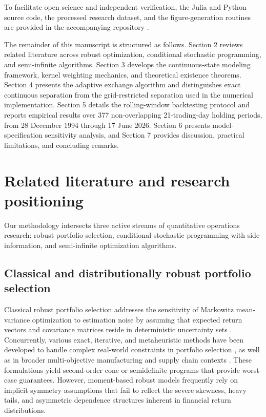\documentclass[smallextended]{svjour3}
\begin{document}
To facilitate open science and independent verification, the Julia and
Python source code, the processed research dataset, and the figure-generation
routines are provided in the accompanying repository
\citep{bezoui2026robust}.

The remainder of this manuscript is structured as follows. Section 2 reviews related literature across robust optimization, conditional stochastic programming, and semi-infinite algorithms. Section 3 develops the continuous-state modeling framework, kernel weighting mechanics, and theoretical existence theorems. Section 4 presents the adaptive exchange algorithm and distinguishes exact continuous separation from the grid-restricted separation used in the numerical implementation. Section 5 details the rolling-window backtesting protocol and reports
empirical results over 377 non-overlapping 21-trading-day holding periods,
from 28 December 1994 through 17 June 2026. Section 6 presents model-specification sensitivity analysis, and Section 7 provides discussion, practical limitations, and concluding remarks.

\section{Related literature and research positioning}
Our methodology intersects three active streams of quantitative operations research: robust portfolio selection, conditional stochastic programming with side information, and semi-infinite optimization algorithms.

\subsection{Classical and distributionally robust portfolio selection}
Classical robust portfolio selection addresses the sensitivity of Markowitz mean-variance optimization to estimation noise by assuming that expected return vectors and covariance matrices reside in deterministic uncertainty sets \citep{goldfarb2003robust, fabozzi2007robust}. Concurrently, various exact, iterative, and metaheuristic methods have been developed to handle complex real-world constraints in portfolio selection \citep{bezoui2019iterative, regaigui2025memetic}, as well as in broader multi-objective manufacturing and supply chain contexts \citep{bezoui2024hybrid}. These formulations yield second-order cone or semidefinite programs that provide worst-case guarantees. However, moment-based robust models frequently rely on implicit symmetry assumptions that fail to reflect the severe skewness, heavy tails, and asymmetric dependence structures inherent in financial return distributions.
\end{document}

